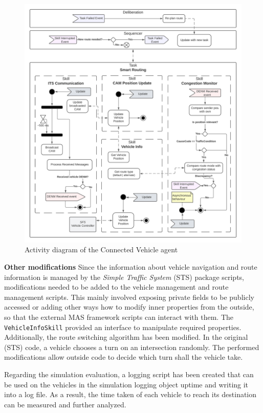 \documentclass[main.tex]{subfiles}
\begin{document}
\begin{figure}[htbp]
    \centering
    \includegraphics[width=.99\textwidth]{SmartRoutingVehicle.png}
    \caption{Activity diagram of the Connected Vehicle agent}
    \label{ad-smartRoutingVehicle}
\end{figure}

\textbf{Other modifications} \smallskip \newline
Since the information about vehicle navigation and route information is managed by the
\emph{Simple Traffic System} (STS) package scripts, modifications needed to be added to the
vehicle management and route management scripts. This mainly involved exposing private fields
to be publicly accessed or adding other ways how to modify inner properties from the outside,
so that the external MAS framework scripts can interact with them. The
\texttt{VehicleInfoSkill} provided an interface to manipulate required properties.
Additionally, the route switching algorithm has been modified. In the original (STS) code,
a vehicle chooses a turn on an intersection randomly. The performed modifications allow outside 
code to decide which turn shall the vehicle take.

Regarding the simulation evaluation, a logging script has been created that can be used on the 
vehicles in the simulation logging object uptime and writing it into a log file. As a result, 
the time taken of each vehicle to reach its destination can be measured and further analyzed.
\end{document}
